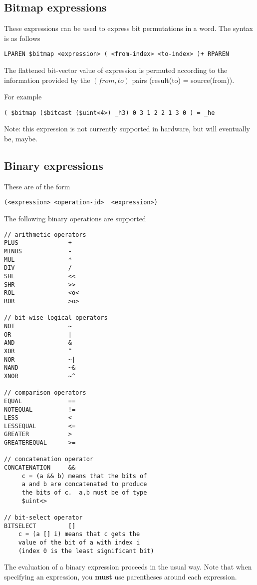 \documentclass{article}
\begin{document}
\subsection{Bitmap expressions}

These expressions can be used to express bit permutations
in a word.  The syntax is as follows
\begin{verbatim}
LPAREN $bitmap <expression> ( <from-index> <to-index> )+ RPAREN
\end{verbatim}
The flattened bit-vector value of expression is permuted according
to the information provided by the $(from,to)$ pairs (result(to) = source(from)).

For example
\begin{verbatim}
( $bitmap ($bitcast ($uint<4>) _h3) 0 3 1 2 2 1 3 0 ) = _he
\end{verbatim}

Note: this expression is not currently supported in hardware,
but will eventually be, maybe.


\subsection{Binary expressions}

These are of the
form
\begin{verbatim}
(<expression> <operation-id>  <expression>)
\end{verbatim}
The following binary operations are supported
\begin{verbatim}
// arithmetic operators
PLUS              + 
MINUS             - 
MUL               * 
DIV               / 
SHL               <<
SHR               >> 
ROL               <o<
ROR               >o> 

// bit-wise logical operators
NOT               ~     
OR                |     
AND               &    
XOR               ^   
NOR               ~|     
NAND              ~&    
XNOR              ~^   

// comparison operators
EQUAL             ==
NOTEQUAL          !=
LESS              < 
LESSEQUAL         <=
GREATER           > 
GREATEREQUAL      >=

// concatenation operator
CONCATENATION     &&
     c = (a && b) means that the bits of
     a and b are concatenated to produce
     the bits of c.  a,b must be of type
     $uint<>

// bit-select operator
BITSELECT         []
    c = (a [] i) means that c gets the
    value of the bit of a with index i 
    (index 0 is the least significant bit)
\end{verbatim}
The evaluation of a binary expression proceeds in
the usual way.  Note that when specifying an 
expression, you {\bf must} use parentheses around
each expression.
\end{document}
